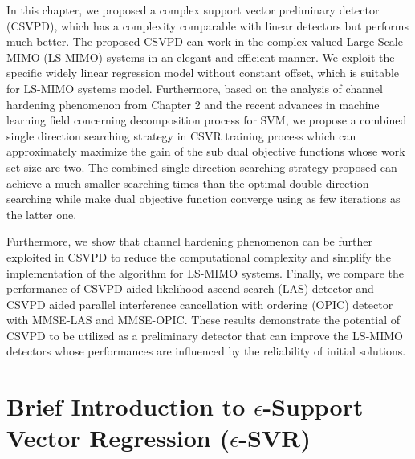 In this chapter, we proposed a complex support vector preliminary detector (CSVPD), which has a complexity  comparable with linear detectors but performs much better. The proposed CSVPD can work in the complex valued Large-Scale MIMO (LS-MIMO) systems in an elegant and efficient manner. We exploit the specific widely linear regression model without constant offset, which is suitable for LS-MIMO systems model. Furthermore, based on the analysis of channel hardening phenomenon from Chapter 2 and the recent advances in machine learning field concerning decomposition process for SVM\cite{steinwart2011training}, we propose a combined single direction searching strategy in CSVR training process which can approximately maximize the gain of the sub dual objective functions whose work set size are two. The combined single direction searching strategy proposed can achieve a much smaller searching times than the optimal double direction searching while make dual objective function converge using as few iterations as the latter one. 
  
  Furthermore, we show that channel hardening phenomenon can be further exploited in CSVPD to reduce the computational complexity and simplify the implementation of the algorithm for LS-MIMO systems. Finally, we compare the performance of CSVPD aided likelihood ascend search (LAS) detector and CSVPD aided parallel interference cancellation with ordering (OPIC) detector with MMSE-LAS and MMSE-OPIC. These results demonstrate the potential of CSVPD to be utilized as a preliminary detector that can improve the LS-MIMO detectors whose performances are influenced by the reliability of initial solutions.  


\section{Brief Introduction to $\epsilon$-Support Vector Regression ($\epsilon$-SVR)}

